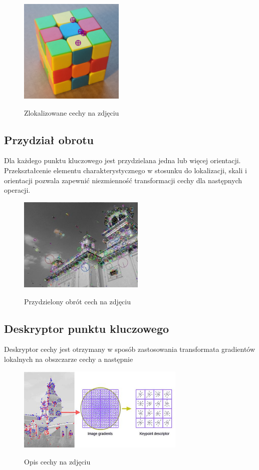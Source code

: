       \begin{figure}[h]
         \centering
         \includegraphics[width=5cm]{SIFT_cube_points.png}
         \label {fig:SIFT_points}
         \caption{Zlokalizowane cechy na zdjęciu}
      \end{figure}

\subsection{Przydział obrotu}
      Dla każdego punktu kluczowego jest przydzielana jedna lub więcej orientacji.
      Przekształcenie elementu charakterystycznego w stosunku do lokalizacji, skali i orientacji pozwala zapewnić niezmienność transformacji cechy dla następnych operacji.
      \begin{figure}[h]
         \centering
         \includegraphics[width=6cm]{SIFT_opencv.jpg}
         \label {fig:SIFT_rot}
         \caption{Przydzielony obrót cech na zdjęciu}
      \end{figure}
\subsection{Deskryptor punktu kluczowego}
      Deskryptor cechy jest otrzymany w sposób zastosowania transformata gradientów lokalnych na obszczarze cechy a następnie
      \begin{figure}[h]
         \centering
         \includegraphics[width=8cm]{SIFT_vectors.jpg}
         \label {fig:SIFT_desc}
         \caption{Opis cechy na zdjęciu}
      \end{figure}

